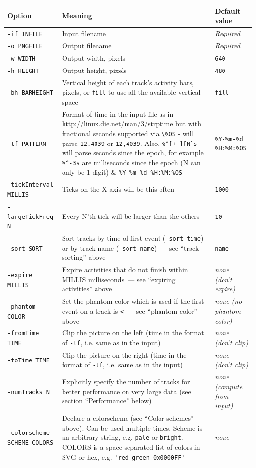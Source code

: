 \documentclass{article}
\begin{document}
\begin{longtable}{|l|p{160px}|l|}
\hline
Option & Meaning & Default value \\
\hline
\endhead
\verb|-if INFILE| & Input filename & \emph{Required} \\
\hline
\verb|-o PNGFILE| & Output filename & \emph{Required} \\
\hline
\verb|-w WIDTH|   & Output width, pixels & \verb|640| \\
\hline
\verb|-h HEIGHT|  & Output height, pixels & \verb|480| \\
\hline
\verb|-bh BARHEIGHT| & Vertical height of each track's activity bars, pixels, or \verb|fill| to use all the available vertical space & \verb|fill| \\
\hline
\verb|-tf PATTERN| & Format of time in the input file as in http://linux.die.net/man/3/strptime but with fractional seconds supported via \verb|\%OS| - will parse \verb|12.4039| or \verb|12,4039|.  Also, \verb|%^[+-][N]s| will parse seconds since the epoch, for example \verb|%^-3s| are milliseconds since the epoch (N can only be 1 digit) & \verb|%Y-%m-%d %H:%M:%OS| \\
\hline
\verb|-tickInterval MILLIS| & Ticks on the X axis will be this often & \verb|1000| \\
\hline
\verb|-largeTickFreq N| & Every N'th tick will be larger than the others & \verb|10| \\
\hline
\verb|-sort SORT| & Sort tracks by time of first event (\verb|-sort time|) or by track name (\verb|-sort name|)~--- see ``track sorting'' above & \verb|name| \\
\hline
\verb|-expire MILLIS| & Expire activities that do not finish within MILLIS milliseconds~--- see ``expiring activities'' above & \emph{none (don't expire)} \\
\hline
\verb|-phantom COLOR| & Set the phantom color which is used if the first event on a track is \texttt{<}~--- see ``phantom color'' above & \emph{none (no phantom color)} \\
\hline
\verb|-fromTime TIME| & Clip the picture on the left (time in the format of \verb|-tf|, i.e. same as in the input) & \emph{none (don't clip)} \\
\hline
\verb|-toTime TIME| & Clip the picture on the right (time in the format of \verb|-tf|, i.e. same as in the input) & \emph{none (don't clip)} \\
\hline
\verb|-numTracks N| & Explicitly specify the number of tracks for better performance on very large data (see section ``Performance'' below) & \emph{none (compute from input)} \\
\hline
\verb|-colorscheme SCHEME COLORS| & Declare a colorscheme (see ``Color schemes'' above). Can be used multiple times. Scheme is an arbitrary string, e.g. \verb|pale| or \verb|bright|. COLORS is a space-separated list of colors in SVG or hex, e.g. \verb|'red green 0x0000FF'| & \emph{none} \\
\hline
\end{longtable}
\end{document}
